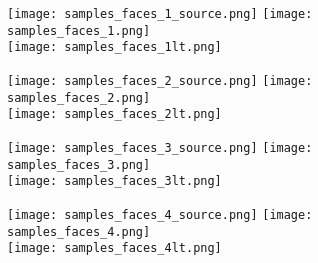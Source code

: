 \documentclass{article}
\begin{document}
\begin{figure*}[t]

\begin{subfigure}{0.98\textwidth}
  \centering
  \texttt{[image: samples\_faces\_1\_source.png]}
  \hspace{14pt}
  \texttt{[image: samples\_faces\_1.png]}
 \\
 \hspace{14pt}\hspace{30.5pt}
 \texttt{[image: samples\_faces\_1lt.png]}
\end{subfigure}

\vspace{3pt}

 \begin{subfigure}{0.98\textwidth}
   \centering
   \texttt{[image: samples\_faces\_2\_source.png]}
  \hspace{14pt}
   \texttt{[image: samples\_faces\_2.png]}
 \\
 \hspace{14pt}\hspace{30.5pt}
  \texttt{[image: samples\_faces\_2lt.png]}
 \end{subfigure}

 \vspace{3pt}

 \begin{subfigure}{0.98\textwidth}
   \centering
   \texttt{[image: samples\_faces\_3\_source.png]}
  \hspace{14pt}
   \texttt{[image: samples\_faces\_3.png]}
 \\
 \hspace{14pt}\hspace{30.5pt}
  \texttt{[image: samples\_faces\_3lt.png]}
 \end{subfigure}

 \vspace{3pt}

\begin{subfigure}{0.98\textwidth}
  \centering
  \texttt{[image: samples\_faces\_4\_source.png]}
  \hspace{14pt}
  \texttt{[image: samples\_faces\_4.png]}
 \\
 \hspace{14pt}\hspace{30.5pt}
 \texttt{[image: samples\_faces\_4lt.png]}
\end{subfigure}


\end{figure*}
\end{document}
